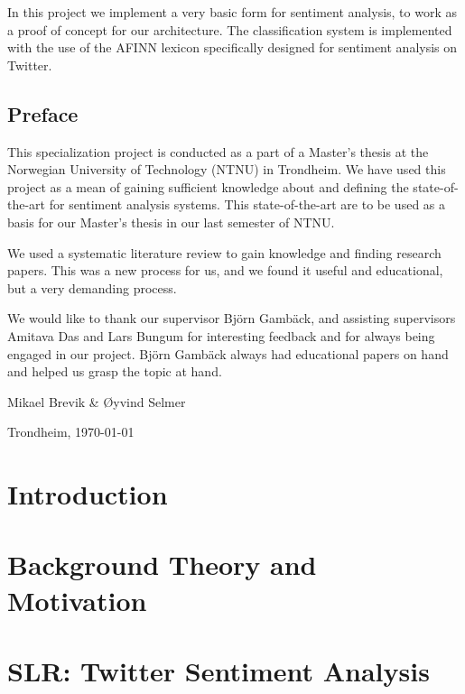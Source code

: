 \documentclass[a4paper, 11pt]{book}
\newcommand{\thesisAuthor}{Mikael Brevik \& Øyvind Selmer}
\begin{document}
In this project we implement a very basic form for sentiment analysis, to work as a proof of concept for our architecture. The classification system is implemented with the use of the AFINN lexicon specifically designed for sentiment analysis on Twitter.

\clearpage

\section*{Preface}

This specialization project is conducted as a part of a Master's thesis at the Norwegian University of Technology (NTNU) in Trondheim. We have used this project as a mean of gaining sufficient knowledge about and defining the state-of-the-art for sentiment analysis systems. This state-of-the-art are to be used as a basis for our Master's thesis in our last semester of NTNU. 


We used a systematic literature review to gain knowledge and finding research papers. This was a new process for us, and we found it useful and educational, but a very demanding process. 


We would like to thank our supervisor Björn Gambäck, and assisting supervisors Amitava Das and Lars Bungum for interesting feedback and for always being engaged in our project. Björn Gambäck always had educational papers on hand and helped us grasp the topic at hand.


\vfill

\hfill \thesisAuthor

\hfill Trondheim, \today

\clearpage

\tableofcontents

\listoffigures

\listoftables

\mainmatter
\chapter{Introduction}


\chapter{Background Theory and Motivation}


\chapter{SLR: Twitter Sentiment Analysis}

\end{document}
